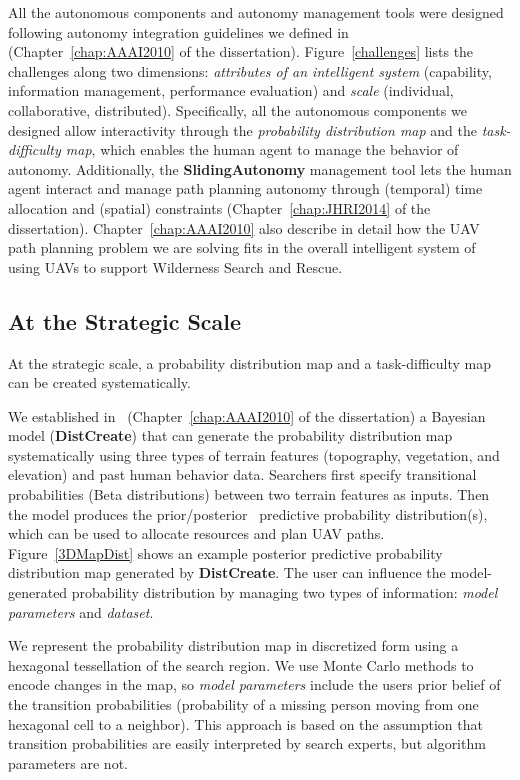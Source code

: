All the autonomous components and autonomy management tools were designed following autonomy integration guidelines we defined in~\cite{Lin2010Supporting} (Chapter~\ref{chap:AAAI2010} of the dissertation). Figure~\ref{challenges} lists the challenges along two dimensions: \textit{attributes of an intelligent system} (capability, information management, performance evaluation) and \textit{scale} (individual, collaborative, distributed). Specifically, all the autonomous components we designed allow interactivity through the \textit{probability distribution map} and the \textit{task-difficulty map}, which enables the human agent to manage the behavior of autonomy. Additionally, the \textbf{SlidingAutonomy} management tool lets the human agent interact and manage path planning autonomy through (temporal) time allocation and (spatial) constraints (Chapter~\ref{chap:JHRI2014} of the dissertation). Chapter~\ref{chap:AAAI2010} also describe in detail how the UAV path planning problem we are solving fits in the overall intelligent system of using UAVs to support Wilderness Search and Rescue. 

\subsection{At the Strategic Scale}

At the strategic scale, a probability distribution map and a task-difficulty map can be created systematically.

We established in~\cite{Lin2010Bayesian} (Chapter~\ref{chap:AAAI2010} of the dissertation) a Bayesian model (\textbf{DistCreate}) that can generate the probability distribution map systematically using three types of terrain features (topography, vegetation, and elevation) and past human behavior data. Searchers first specify transitional probabilities (Beta distributions) between two terrain features as inputs. Then the model produces the prior/posterior~\cite{Russell2009Artificial} predictive probability distribution(s), which can be used to allocate resources and plan UAV paths. Figure~\ref{3DMapDist} shows an example posterior predictive probability distribution map generated by \textbf{DistCreate}. The user can influence the model-generated probability distribution by managing two types of information: \textit{model parameters} and \textit{dataset}. 

We represent the probability distribution map in discretized form using a hexagonal tessellation of the search region. We use Monte Carlo methods to encode changes in the map, so \textit{model parameters} include the users prior belief of the transition probabilities (probability of a missing person moving from one hexagonal cell to a neighbor). This approach is based on the assumption that transition probabilities are easily interpreted by search experts, but algorithm parameters are not. 

